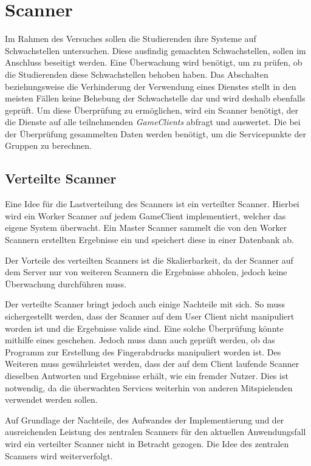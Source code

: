 \section{Scanner} \label{sec:Scanner}
Im Rahmen des Versuches sollen die Studierenden ihre Systeme auf Schwachstellen untersuchen. Diese ausfindig gemachten Schwachstellen, sollen im Anschluss beseitigt werden. Eine Überwachung wird benötigt, um zu prüfen, ob die Studierenden diese Schwachstellen behoben haben. Das Abschalten beziehungsweise die Verhinderung der Verwendung eines Dienstes stellt in den meisten Fällen keine Behebung der Schwachstelle dar und wird deshalb ebenfalls geprüft. Um diese Überprüfung zu ermöglichen, wird ein Scanner benötigt, der die Dienste auf alle teilnehmenden \textit{GameClients} abfragt und auswertet. Die bei der Überprüfung gesammelten Daten werden benötigt, um die Servicepunkte der Gruppen zu berechnen.

\subsection{Verteilte Scanner}
Eine Idee für die Lastverteilung des Scanners ist ein verteilter Scanner. Hierbei wird ein Worker Scanner auf jedem GameClient implementiert, welcher das eigene System überwacht. Ein Master Scanner sammelt die von den Worker Scannern erstellten Ergebnisse ein und speichert diese in einer Datenbank ab. 

Der Vorteile des verteilten Scanners ist die Skalierbarkeit, da der Scanner auf dem Server nur von weiteren Scannern die Ergebnisse abholen, jedoch keine Überwachung durchführen muss.

Der verteilte Scanner bringt jedoch auch einige Nachteile mit sich. So muss sichergestellt werden, dass der Scanner auf dem User Client nicht manipuliert worden ist und die Ergebnisse valide sind. Eine solche Überprüfung könnte mithilfe eines  geschehen. Jedoch muss dann auch geprüft werden, ob das Programm zur Erstellung des Fingerabdrucks manipuliert worden ist.   Des Weiteren muss gewährleistet werden, dass der auf dem Client laufende Scanner dieselben Antworten und Ergebnisse erhält, wie ein fremder Nutzer. Dies ist notwendig, da die überwachten Services weiterhin von anderen Mitspielenden verwendet werden sollen.

Auf Grundlage der Nachteile, des Aufwandes der Implementierung und der ausreichenden Leistung des zentralen Scanners für den aktuellen Anwendungsfall wird ein verteilter Scanner nicht in Betracht gezogen. Die Idee des zentralen Scanners wird weiterverfolgt.

